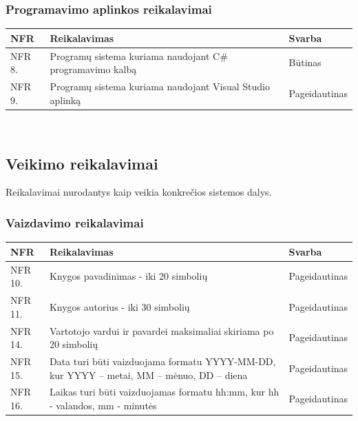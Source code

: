 \documentclass{VUMIFPSkursinis}
\begin{document}
    \subsubsection{Programavimo aplinkos reikalavimai}
    \noindent
    	\begin{tabular}{ | p{} | p{} | p{} |}
    		\hline
   			NFR & Reikalavimas & Svarba       \\ \hline
		  	NFR 8. & Programų sistema kuriama naudojant C\# programavimo kalbą & Būtinas \\ \hline
            NFR 9. & Programų sistema kuriama naudojant Visual Studio aplinką & Pageidautinas \\ \hline
   		\end{tabular}\\

\subsection{Veikimo reikalavimai}
Reikalavimai nurodantys kaip veikia konkrečios sistemos dalys.
	\subsubsection{Vaizdavimo reikalavimai}
    \noindent
    \begin{centering}
    	\begin{tabular}{ | p{} | p{} | p{} |}
    		\hline
   			NFR & Reikalavimas & Svarba       \\ \hline
		  	NFR 10. & Knygos pavadinimas - iki 20 simbolių & Pageidautinas \\ \hline
            NFR 11. & Knygos autorius - iki 30 simbolių & Pageidautinas \\ \hline
            NFR 14. & Vartotojo vardui ir pavardei maksimaliai skiriama po 20 simbolių & Pageidautinas \\ \hline
            NFR 15. & Data turi būti vaizduojama formatu YYYY-MM-DD, kur YYYY – metai, MM – mėnuo, DD – diena & Pageidautinas \\ \hline
            NFR 16. & Laikas turi būti vaizduojamas formatu hh:mm, kur hh - valandos, mm - minutės & Pageidautinas \\ \hline
   		\end{tabular}\\
    \end{centering}
    
\end{document}
